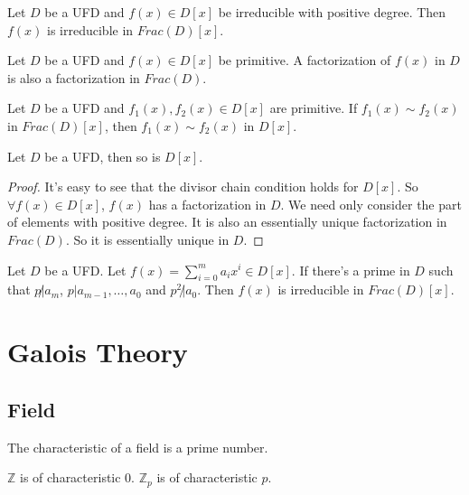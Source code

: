 \documentclass[12pt]{book}
\begin{document}
\begin{lemma}
	Let $D$ be a UFD and $f(x)\in D[x]$ be irreducible with positive degree. Then $f(x)$ is irreducible in $Frac(D)[x]$.
\end{lemma}

\begin{lemma}
	Let $D$ be a UFD and $f(x)\in D[x]$ be primitive. A factorization of $f(x)$ in $D$ is also a factorization in $Frac(D)$.
\end{lemma}

\begin{lemma}
	Let $D$ be a UFD and $f_1(x),f_2(x)\in D[x]$ are primitive. If $f_1(x)\sim f_2(x)$ in $Frac(D)[x]$, then $f_1(x)\sim f_2(x)$ in $D[x]$.
\end{lemma}

\begin{lemma}
	Let $D$ be a UFD, then so is $D[x]$.
\end{lemma}
\begin{proof}
	It's easy to see that the divisor chain condition holds for $D[x]$. So $\forall f(x)\in D[x]$, $f(x)$ has a factorization in $D$. We need only consider the part of elements with positive degree. It is also an essentially unique factorization in $Frac(D)$. So it is essentially unique in $D$.
\end{proof}

\begin{lemma}[Eisenstein]
	Let $D$ be a UFD. Let $f(x)=\sum_{i=0}^m a_ix^i\in D[x]$. If there's a prime in $D$ such that $p\not|a_m$, $p|a_{m-1},\dots,a_0$ and $p^2\not|a_0$. Then $f(x)$ is irreducible in $Frac(D)[x]$.
\end{lemma}

\chapter{Galois Theory}

\section{Field} 

\begin{lemma}
	The characteristic of a field is a prime number.
\end{lemma}

\begin{example}
	$\mathbb Z$ is of characteristic 0. $\mathbb Z_p$ is of characteristic $p$.
\end{example}
\end{document}
